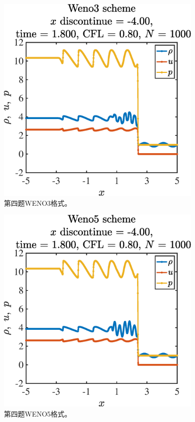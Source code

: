 \documentclass[12pt]{article}
\begin{document}
\begin{figure}[htp]
	\centering
	\includegraphics[width=10cm]{4weno3.eps}
	\caption{第四题WENO3格式。}
	\label{fig:4weno3}
\end{figure}

\begin{figure}[htp]
	\centering
	\includegraphics[width=10cm]{4weno5.eps}
	\caption{第四题WENO5格式。}
	\label{fig:4weno5}
\end{figure}



\end{document}
